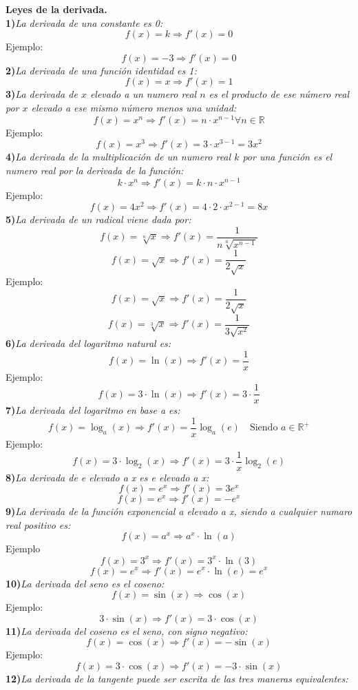 \documentclass[11pt]{report}
\newcommand{\R}{\mathbb{R}}
\begin{document}
\pagebreak \textbf{Leyes de la derivada.}\\[2mm]
\textbf{1)}\textit{La derivada de una constante es 0:}
$$f(x)=k\Longrightarrow f'(x)=0$$
Ejemplo:
$$f(x)=-3 \Longrightarrow f'(x)=0$$
\textbf{2)}\textit{La derivada de una función identidad es 1:}
$$f(x)=x \Longrightarrow f'(x)=1$$
\textbf{3)}\textit{La derivada de $x$ elevado a un numero real $n$ es el producto de ese número real por $x$ elevado a ese mismo número menos una unidad:}
$$f(x)=x^n \Longrightarrow f'(x)=n\cdot x^{n-1}\forall n \in \R$$
Ejemplo:
$$f(x)=x^3 \Longrightarrow f'(x)=3\cdot x^{3-1}=3x^2$$
\textbf{4)}\textit{La derivada de la multiplicación de un numero real $k$ por una función es el numero real por la derivada de la función:}
$$k\cdot x^n \Longrightarrow f'(x)=k\cdot n\cdot x^{n-1}$$
Ejemplo:
$$f(x)=4x^2 \Longrightarrow f'(x)=4\cdot 2\cdot x^{2-1}=8x$$
\textbf{5)}\textit{La derivada de un radical viene dada por:}
$$f(x)=\sqrt[n]{x}\Longrightarrow f'(x)=\frac{1}{n\sqrt[n]{x^{n-1}}}$$
$$f(x)=\sqrt{x} \Longrightarrow f'(x)=\frac{1}{2\sqrt{x}}$$
Ejemplo:
$$f(x)=\sqrt{x} \Longrightarrow f'(x)=\frac{1}{2\sqrt{x}}$$
$$f(x)=\sqrt[3]{x} \Longrightarrow f'(x)=\frac{1}{3\sqrt{x^2}}$$
\textbf{6)}\textit{La derivada del logaritmo natural es:}
$$f(x)=\ln(x) \Longrightarrow f'(x)=\frac{1}{x}$$
Ejemplo:
$$f(x)=3\cdot \ln(x) \Longrightarrow f'(x)=3\cdot \frac{1}{x}$$
\textbf{7)}\textit{La derivada del logaritmo en base a es:}
$$f(x)=\log_a(x) \Longrightarrow f'(x)=\frac{1}{x}\log_a(e) \quad \text{Siendo }a \in \R^+$$
Ejemplo:
$$f(x)=3\cdot \log_2(x) \Longrightarrow f'(x)=3\cdot \frac{1}{x}\log_2(e)$$
\textbf{8)}\textit{La derivada de e elevado a x es e elevado a x:}
$$f(x)=e^x \Longrightarrow f'(x)=3e^x$$
$$f(x)=e^x \Longrightarrow f'(x)=-e^x$$
\textbf{9)}\textit{La derivada de la función exponencial a elevado a x, siendo a cualquier numaro real positivo es:}
$$f(x)=a^x \Longrightarrow a^x\cdot \ln(a)$$
Ejemplo
$$f(x)=3^x \Longrightarrow f'(x)=3^x\cdot \ln(3)$$
$$f(x)=e^x \Longrightarrow f'(x)=e^x\cdot \ln(e)=e^x$$
\textbf{10)}\textit{La derivada del seno es el coseno:}
$$f(x)= \sin(x) \Longrightarrow \cos(x)$$
Ejemplo:
$$3\cdot \sin(x) \Longrightarrow f'(x)=3\cdot \cos(x)$$
\textbf{11)}\textit{La derivada del coseno es el seno, con signo negativo:}
$$f(x)=\cos(x) \Longrightarrow f'(x)=-\sin(x)$$
Ejemplo:
$$f(x)=3\cdot \cos(x) \Longrightarrow f'(x)=-3\cdot \sin(x)$$
\textbf{12)}\textit{La derivada de la tangente puede ser escrita de las tres maneras equivalentes:}
\end{document}
